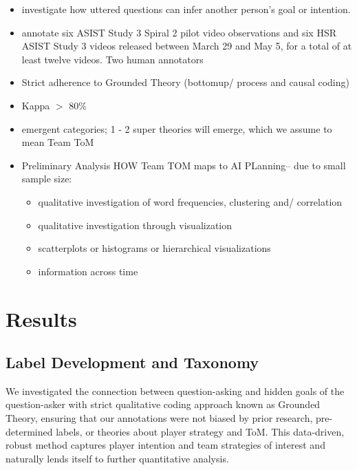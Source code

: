 \documentclass[10pt]{article}
\begin{document}
\begin{itemize}
    \item investigate how uttered questions can infer another person's goal or intention. 
    \item  annotate six ASIST Study 3 Spiral 2 pilot video observations and
six HSR ASIST Study 3 videos released between March 29 and May 5, for a total
of at least twelve videos. Two human annotators
    \item Strict adherence to Grounded Theory (bottomup/ process and causal coding)
    \item Kappa $>$ 80\%
    \item emergent categories; 1 - 2 super theories will emerge, which we assume to mean Team ToM
    \item Preliminary Analysis HOW Team TOM maps to AI PLanning-- due to small sample size:
    \begin{itemize}
        \item qualitative investigation of word frequencies, clustering and/ correlation
        \item qualitative investigation through visualization
        \item scatterplots or histograms or hierarchical visualizations
        \item information across time
    \end{itemize}
 \end{itemize}
 





\section{Results}

\subsection{Label Development and Taxonomy}
We investigated the connection between question-asking and hidden goals of the question-asker with strict qualitative coding approach known as Grounded Theory, ensuring that our annotations were not biased by prior research, pre-determined labels, or theories about player strategy and ToM. This data-driven, robust method captures player intention and team strategies of interest and naturally lends itself to further quantitative analysis. 
\end{document}
